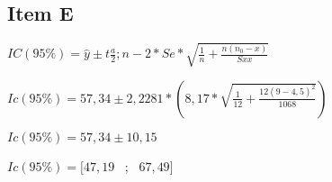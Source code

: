 \documentclass{article}
\begin{document}
\subsection{Item E}

\begin{flushleft}
$IC(95\%) = \hat{y} \pm  t \frac{a}{2}; n-2 *Se * \sqrt{\frac{1}{n} + \frac{n(n_0 - x)}{Sxx}}$ 

$Ic(95\%) = 57,34 \pm 2,2281 *  (8,17* \sqrt{\frac{1}{12} + \frac{12(9-4,5)^2}{1068}})$

$Ic(95\%) =  57,34 \pm 10,15$

$Ic(95\%) = [47,19$ \ ; \ $67,49]$

\end{flushleft}
\end{document}

